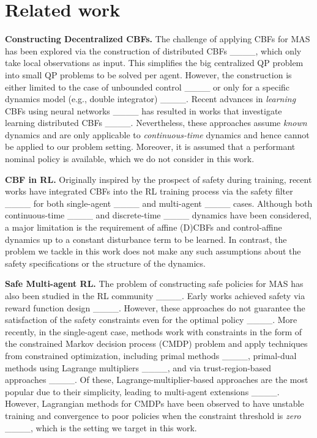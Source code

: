 \section{Related work}
\noindent\textbf{Constructing Decentralized CBFs. }
The challenge of applying CBFs for MAS has been explored via the construction of distributed CBFs ____, which only take local observations as input.
This simplifies the big centralized QP problem into small QP problems to be solved per agent.
However, the construction is either limited to the case of unbounded control ____
or only for a specific dynamics model (e.g., double integrator) ____.
Recent advances in \textit{learning} CBFs using neural networks ____ has resulted in works that investigate learning distributed CBFs ____.
Nevertheless, these approaches assume \textit{known} dynamics and are only applicable to \textit{continuous-time} dynamics and hence cannot be applied to our problem setting. Moreover, it is assumed that a performant nominal policy is available, which we do not consider in this work.

\noindent\textbf{CBF in RL. }
Originally inspired by the prospect of safety during training, recent works have integrated CBFs into the RL training process via the safety filter ____ for both single-agent ____ and multi-agent ____ cases.
Although both continuous-time ____ and discrete-time ____ dynamics have been considered,
a major limitation is the requirement of affine (D)CBFs and control-affine dynamics up to a constant disturbance term to be learned.
In contrast, the problem we tackle in this work does not make any such assumptions about the safety specifications or the structure of the dynamics. 

\noindent\textbf{Safe Multi-agent RL. }
The problem of constructing safe policies for MAS has also been studied in the RL community ____.
Early works achieved safety via reward function design ____.
However, these approaches do not guarantee the satisfaction of the safety constraints even for the optimal policy ____.
More recently, in the single-agent case, methods work with constraints in the form of the constrained Markov decision process (CMDP) problem and apply techniques from constrained optimization, including 
primal methods ____,
primal-dual methods using Lagrange multipliers ____,
and via trust-region-based approaches ____.
Of these, Lagrange-multiplier-based approaches are the most popular due to their simplicity,
leading to multi-agent extensions ____.
However, Lagrangian methods for CMDPs have been observed to have unstable training and convergence to poor policies when the constraint threshold is \textit{zero} 
____, which is the setting we target in this work.